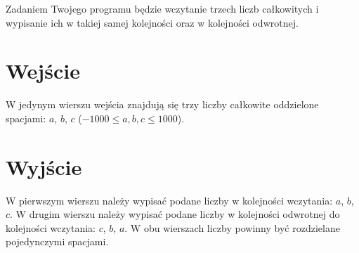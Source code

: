 \documentclass{spiral-kurs}
\begin{document}
\makeheader
%
  Zadaniem Twojego programu będzie wczytanie trzech liczb całkowitych
  i wypisanie ich w takiej samej kolejności oraz w kolejności odwrotnej.
  
  \section{Wejście}
  W jedynym wierszu wejścia znajdują się trzy liczby całkowite oddzielone spacjami:
  $a$, $b$, $c$ ($-1000 \le a,b,c \le 1000$).
  
  \section{Wyjście}
  W pierwszym wierszu należy wypisać podane liczby w kolejności wczytania: $a$, $b$, $c$.
  W drugim wierszu należy wypisać podane liczby w kolejności odwrotnej do 
  kolejności wczytania: $c$, $b$, $a$.
  W obu wierszach liczby powinny być rozdzielane pojedynczymi spacjami.
                                  


  
\end{document}
